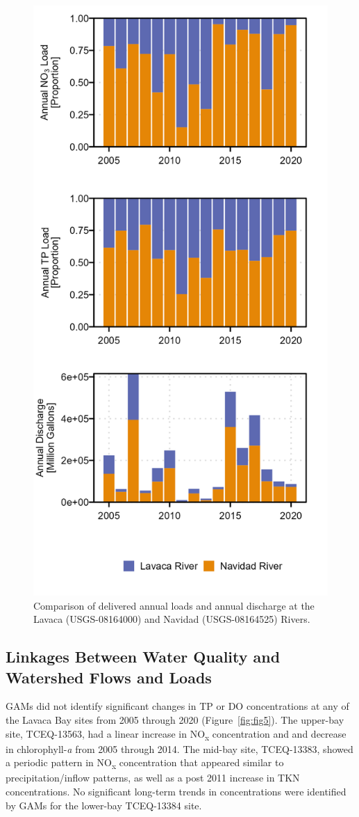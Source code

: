 \documentclass[sn-basic,referee,lineno,pdflatex]{sn-jnl}
\begin{document}
\begin{figure}

{\centering \includegraphics[width=0.5\linewidth,]{Schramm-2023-05-AS_files/figure-latex/fig4-1} 

}

\caption{Comparison of delivered annual loads and annual discharge at the Lavaca (USGS-08164000) and Navidad (USGS-08164525) Rivers.}\label{fig:fig4}
\end{figure}

\hypertarget{linkages-between-water-quality-and-watershed-flows-and-loads}{%
\subsection{Linkages Between Water Quality and Watershed Flows and
Loads}\label{linkages-between-water-quality-and-watershed-flows-and-loads}}

GAMs did not identify significant changes in TP or DO concentrations at
any of the Lavaca Bay sites from 2005 through 2020
(Figure~\ref{fig:fig5}). The upper-bay site, TCEQ-13563, had a linear
increase in NO\textsubscript{x} concentration and and decrease in
chlorophyll-\emph{a} from 2005 through 2014. The mid-bay site,
TCEQ-13383, showed a periodic pattern in NO\textsubscript{x}
concentration that appeared similar to precipitation/inflow patterns, as
well as a post 2011 increase in TKN concentrations. No significant
long-term trends in concentrations were identified by GAMs for the
lower-bay TCEQ-13384 site.
\end{document}
